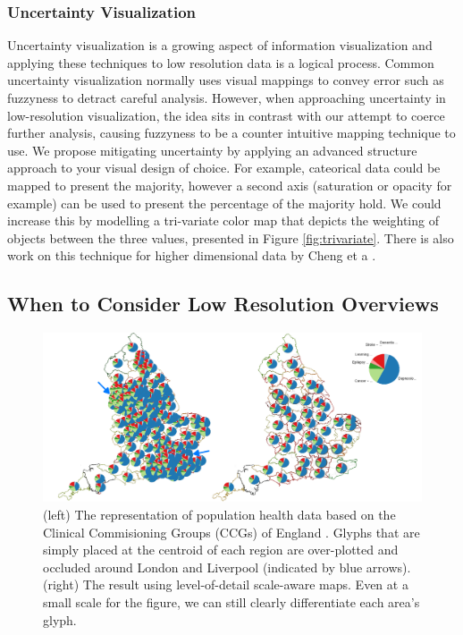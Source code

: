 \subsubsection*{Uncertainty Visualization}
Uncertainty visualization is a growing aspect of information visualization and applying these techniques to low resolution data is a logical process. Common uncertainty visualization normally uses visual mappings to convey error such as fuzzyness to detract careful analysis. However, when approaching uncertainty in low-resolution visualization, the idea sits in contrast with our attempt to coerce further analysis, causing fuzzyness to be a counter intuitive mapping technique to use. We propose mitigating uncertainty by applying an advanced structure approach to your visual design of choice.
For example, cateorical data could be mapped to present the majority, however a second axis (saturation or opacity for example) can be used to present the percentage of the majority hold.
We could increase this by modelling a tri-variate color map that depicts the weighting of objects between the three values, presented in Figure \ref{fig:trivariate}. 
There is also work on this technique for higher dimensional data by Cheng et a \cite{cheng2019colormap}.  

\subsection{When to Consider Low Resolution Overviews}
\begin{figure}[t]
\includegraphics[width=1\textwidth]{images/ch5/ccgsetPie2}
\caption{(left) The representation of population health data based on the Clinical Commisioning Groups (CCGs) of England \cite{publicHealthEngland}. Glyphs that are simply placed at the centroid of each region are over-plotted and occluded around London and Liverpool (indicated by blue arrows). (right) The result using level-of-detail scale-aware maps. Even at a small scale for the figure, we can still clearly differentiate each area's glyph.} \label{fig:occlusion}
\end{figure}

